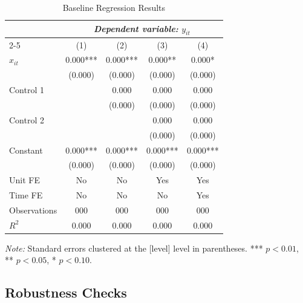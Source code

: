 \documentclass[12pt, a4paper]{article}
\theoremstyle{definition}
\theoremstyle{remark}
\begin{document}
\begin{table}[H]
    \centering
    \caption{Baseline Regression Results}
    \label{tab:results_main}
    \begin{tabular}{lcccc}
        \toprule
        & \multicolumn{4}{c}{\textit{Dependent variable: } $y_{it}$} \\
        \cmidrule(lr){2-5}
        & (1) & (2) & (3) & (4) \\
        \midrule
        $x_{it}$       & 0.000***  & 0.000***  & 0.000**   & 0.000*    \\
                        & (0.000)   & (0.000)   & (0.000)   & (0.000)   \\[4pt]
        Control 1       &           & 0.000     & 0.000     & 0.000     \\
                        &           & (0.000)   & (0.000)   & (0.000)   \\[4pt]
        Control 2       &           &           & 0.000     & 0.000     \\
                        &           &           & (0.000)   & (0.000)   \\[4pt]
        Constant        & 0.000***  & 0.000***  & 0.000***  & 0.000***  \\
                        & (0.000)   & (0.000)   & (0.000)   & (0.000)   \\
        \midrule
        Unit FE         & No        & No        & Yes       & Yes       \\
        Time FE         & No        & No        & No        & Yes       \\
        Observations    & 000       & 000       & 000       & 000       \\
        $R^{2}$         & 0.000     & 0.000     & 0.000     & 0.000     \\
        \bottomrule
    \end{tabular}
    \begin{minipage}{\textwidth}
        \vspace{3pt}
        \footnotesize\textit{Note:} Standard errors clustered at the [level] level in
        parentheses. *** $p<0.01$, ** $p<0.05$, * $p<0.10$.
    \end{minipage}
\end{table}

\subsection{Robustness Checks}
\end{document}
